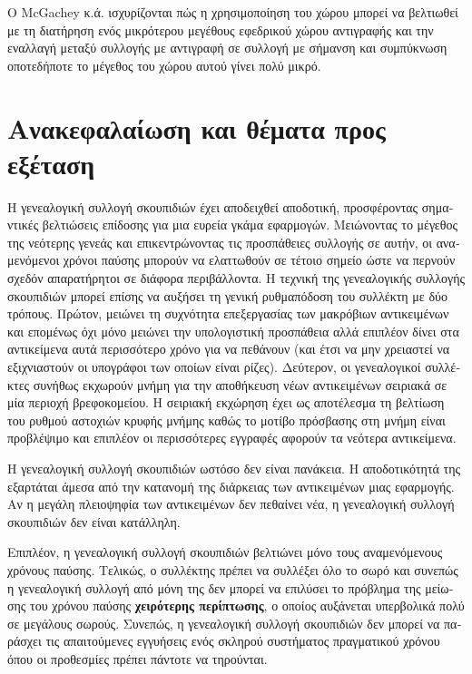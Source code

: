 \begin{greek}
Ο McGachey κ.ά. \cite{DBLP:conf/iwmm/McGacheyH06} ισχυρίζονται
πώς η χρησιμοποίηση του χώρου μπορεί να βελτιωθεί με τη διατήρηση
ενός μικρότερου μεγέθους εφεδρικού χώρου αντιγραφής και την
εναλλαγή μεταξύ συλλογής με αντιγραφή σε συλλογή με σήμανση και
συμπύκνωση οποτεδήποτε το μέγεθος του χώρου αυτού γίνει πολύ
μικρό. 

\section{Ανακεφαλαίωση και θέματα προς εξέταση}
Η γενεαλογική συλλογή σκουπιδιών έχει αποδειχθεί αποδοτική,
προσφέροντας σημαντικές βελτιώσεις επίδοσης για μια ευρεία
γκάμα εφαρμογών. Μειώνοντας το μέγεθος της νεότερης γενεάς
και επικεντρώνοντας τις προσπάθειες συλλογής σε αυτήν, οι
αναμενόμενοι χρόνοι παύσης μπορούν να ελαττωθούν σε τέτοιο
σημείο ώστε να περνούν σχεδόν απαρατήρητοι σε διάφορα περιβάλλοντα.
Η τεχνική της γενεαλογικής συλλογής σκουπιδιών μπορεί επίσης
να αυξήσει τη γενική ρυθμαπόδοση του συλλέκτη με δύο τρόπους.
Πρώτον, μειώνει τη συχνότητα επεξεργασίας των μακρόβιων αντικειμένων
και επομένως όχι μόνο μειώνει την υπολογιστική προσπάθεια αλλά
επιπλέον δίνει στα αντικείμενα αυτά περισσότερο χρόνο για να
πεθάνουν (και έτσι να μην χρειαστεί να εξιχνιαστούν οι υπογράφοι
των οποίων είναι ρίζες). Δεύτερον, οι γενεαλογικοί συλλέκτες
συνήθως εκχωρούν μνήμη για την αποθήκευση νέων αντικειμένων
σειριακά σε μία περιοχή βρεφοκομείου. Η σειριακή εκχώρηση έχει
ως αποτέλεσμα τη βελτίωση του ρυθμού αστοχιών κρυφής μνήμης
καθώς το μοτίβο πρόσβασης στη μνήμη είναι προβλέψιμο και
επιπλέον οι περισσότερες εγγραφές αφορούν τα νεότερα αντικείμενα.

Η γενεαλογική συλλογή σκουπιδιών ωστόσο δεν είναι πανάκεια.
Η αποδοτικότητά της εξαρτάται άμεσα από την κατανομή της διάρκειας
των αντικειμένων μιας εφαρμογής. Αν η μεγάλη πλειοψηφία των
αντικειμένων δεν πεθαίνει νέα, η γενεαλογική συλλογή σκουπιδιών
δεν είναι κατάλληλη.

Επιπλέον, η γενεαλογική συλλογή σκουπιδιών βελτιώνει μόνο
τους αναμενόμενους χρόνους παύσης. Τελικώς, ο συλλέκτης πρέπει
να συλλέξει όλο το σωρό και συνεπώς η γενεαλογική συλλογή από
μόνη της δεν μπορεί να επιλύσει το πρόβλημα της μείωσης του
χρόνου παύσης \textbf{χειρότερης περίπτωσης}, ο οποίος αυξάνεται
υπερβολικά πολύ σε μεγάλους σωρούς. Συνεπώς, η γενεαλογική
συλλογή σκουπιδιών δεν μπορεί να παράσχει τις απαιτούμενες εγγυήσεις
ενός σκληρού συστήματος πραγματικού χρόνου όπου οι προθεσμίες
πρέπει πάντοτε να τηρούνται.


\end{greek}
